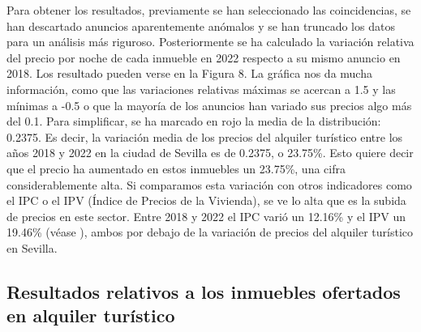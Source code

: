 \documentclass[a4paper,10pt]{article}
\begin{document}
            Para obtener los resultados, previamente se han seleccionado las coincidencias, se han descartado 
            anuncios aparentemente anómalos y se han truncado los datos para un análisis más riguroso. Posteriormente se ha calculado la variación
            relativa del precio por noche de cada inmueble en 2022 respecto a su mismo anuncio en 2018. Los resultado pueden verse 
            en la Figura 8. La gráfica nos da mucha información, como que las variaciones relativas máximas se acercan a 1.5 y las mínimas 
            a -0.5 o que la mayoría de los anuncios han variado sus precios algo más del 0.1. Para simplificar, se ha marcado en rojo la media de 
            la distribución: 0.2375. Es decir, la variación media de los precios del alquiler turístico entre los años 2018 y 2022 en la ciudad de Sevilla
            es de 0.2375, o 23.75\%. Esto quiere decir que el precio ha aumentado en estos inmuebles un 23.75\%, una cifra considerablemente alta.
            Si comparamos esta variación con otros indicadores como el IPC o el IPV (Índice de Precios de la Vivienda), se ve lo alta que es la subida de 
            precios en este sector. Entre 2018 y 2022 el IPC varió un 12.16\% y el IPV un 19.46\% (véase \cite[(1) y (2)]{ine}), ambos por
            debajo de la variación de precios del alquiler turístico en Sevilla.

        \clearpage 

        \subsection{Resultados relativos a los inmuebles ofertados en alquiler turístico}
\end{document}
